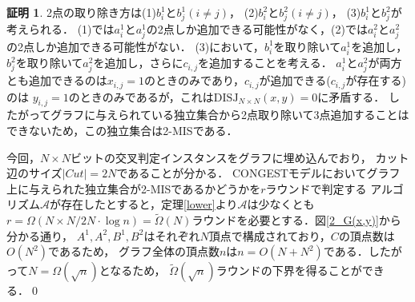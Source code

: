 \documentclass[12pt]{thesis}
\newcommand{\CONGEST}{\textsf{CONGEST}}
\theoremstyle{definition}
\newtheorem*{prf*}{証明}
\begin{document}
\begin{prf*}
2点の取り除き方は(1)$b_{i}^{1}$と$b_{j}^{1}(i \neq j)$， (2)$b_{i}^{2}$と$b_{j}^{2}(i \neq j)$， (3)$b_{i}^{1}$と$b_{j}^{2}$が考えられる．
(1)では$a_{i}^{1}$と$a_{j}^{1}$の2点しか追加できる可能性がなく，(2)では$a_{i}^{2}$と$a_{j}^{2}$の2点しか追加できる可能性がない．
(3)において，$b_{i}^{1}$を取り除いて$a_{i}^{1}$を追加し，$b_{j}^{2}$を取り除いて$a_{j}^{2}$を追加し，さらに$c_{i, j}$を追加することを考える．
$a_{i}^{1}$と$a_{j}^{2}$が両方とも追加できるのは$x_{i, j} = 1$のときのみであり，$c_{i, j}$が追加できる($c_{i, j}$が存在する)のは
$y_{i, j} = 1$のときのみであるが，これは$\mathrm{DISJ}_{N \times N} (x, y) = 0$に矛盾する．
したがってグラフに与えられている独立集合から2点取り除いて3点追加することはできないため，この独立集合は2-MISである．

今回，$N \times N$ビットの交叉判定インスタンスをグラフに埋め込んでおり，
カット辺のサイズ$|\mathit{Cut}| = 2N$であることが分かる．
{\CONGEST}モデルにおいてグラフ上に与えられた独立集合が2-MISであるかどうかを$r$ラウンドで判定する
アルゴリズム$\mathcal{A}$が存在したとすると，定理\ref{lower}より$\mathcal{A}$は少なくとも
$r = \Omega (N \times N/ 2N \cdot \log n) = \tilde{\Omega}(N)$ラウンドを必要とする．図\ref{2_G(x,y)}から分かる通り，
$A^{1}, A^{2}, B^{1}, B^{2}$はそれぞれ$N$頂点で構成されており，$C$の頂点数は$O(N^{2})$であるため，
グラフ全体の頂点数$n$は$n = O(N + N^{2})$である．したがって$N = \Omega(\sqrt{n})$となるため，
$\tilde{\Omega}(\sqrt{n})$ラウンドの下界を得ることができる．\qed
\end{prf*}
\newpage
\end{document}
